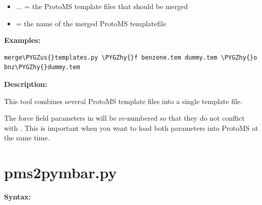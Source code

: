 \documentclass[letterpaper,10pt,english]{sphinxmanual}
\def\PYGZus{\char`\_}
\def\PYGZhy{\char`\-}
\begin{document}
\begin{itemize}
\item {} 
 ... = the ProtoMS template files that should be merged

\item {} 
 = the name of the merged ProtoMS templatefile

\end{itemize}

\textbf{Examples:}

\begin{Verbatim}[commandchars=\\\{\}]
merge\PYGZus{}templates.py \PYGZhy{}f benzene.tem dummy.tem \PYGZhy{}o bnz\PYGZhy{}dummy.tem
\end{Verbatim}

\textbf{Description:}

This tool combines several ProtoMS template files into a single template file.

The force field parameters in  will be re-numbered so that they do not conflict with . This is important when you want to load both parameters into ProtoMS at the same time.


\section{pms2pymbar.py}
\label{tools:pms2pymbar-py}
\textbf{Syntax:}
\end{document}
